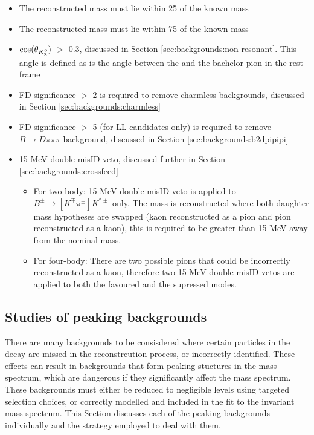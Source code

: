 \begin{itemize}
\item The reconstructed \Dz mass must lie within 25 \mev of the known \Dz mass
\item The reconstructed \Kstarm mass must lie within 75 \mev of the known \Kstarp mass
\item{\textbar $\cos(\theta_{{{K}^0_{\mathrm{ \scriptscriptstyle S}}}})$ \textbar $>$ 0.3, discussed in Section \ref{sec:backgrounds:non-resonant}. This angle is defined as is the angle between the \KS and the bachelor pion in the \Kstarm rest frame}
\item{\Dz FD significance $>$ 2 is required to remove charmless backgrounds, discussed in Section \ref{sec:backgrounds:charmless}}
\item{\KS FD significance $>$ 5 (for LL candidates only) is required to remove $B \to D\pi\pi\pi$ background, discussed in Section \ref{sec:backgrounds:b2dpipipi}}
\item{15 MeV double misID veto, discussed further in Section \ref{sec:backgrounds:crossfeed}}
\begin{itemize}
\item For two-body: 15 MeV double misID veto is applied to $B^{\pm} \to [K^{\mp}\pi^{\pm}] K^{*\pm}$ only. The \Dz mass is reconstructed where both daughter mass hypotheses are swapped (kaon reconstructed as a pion and pion reconstructed as a kaon), this is required to be greater than 15 MeV away from the nominal \Dz mass.
\item For four-body: There are two possible pions that could be incorrectly reconstructed as a kaon, therefore two 15 MeV double misID vetos are applied to both the favoured and the supressed modes. 
\end{itemize} 
\end{itemize}

\subsection{Studies of peaking backgrounds}
\label{sec:backgrounds}

There are many backgrounds to be consisdered where certain particles in the decay are missed in the reconstrcution process, or incorrectly identified. These effects can result in backgrounds that form peaking stuctures in the \B mass spectrum, which are dangerous if they significantly affect the \B mass spectrum. These backgrounds must either be reduced to negligible levels using targeted selection choices, or correctly modelled and included in the fit to the invariant \B mass spectrum. This Section discusses each of the peaking backgrounds individually and the strategy employed to deal with them.

